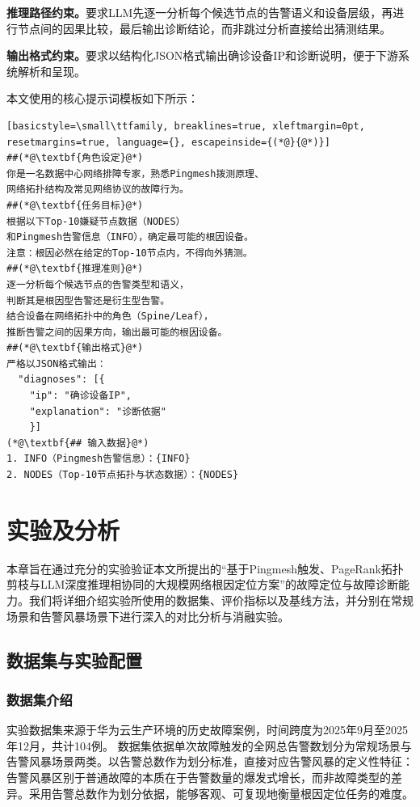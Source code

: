 \textbf{推理路径约束。}要求LLM先逐一分析每个候选节点的告警语义和设备层级，再进行节点间的因果比较，最后输出诊断结论，而非跳过分析直接给出猜测结果。

\textbf{输出格式约束。}要求以结构化JSON格式输出确诊设备IP和诊断说明，便于下游系统解析和呈现。

本文使用的核心提示词模板如下所示：


\begin{tcolorbox}[breakable,
    colback=gray!3, colframe=gray!60,
    title={\textbf{语义推理模块 提示词模板}},
    fonttitle=\bfseries, fontupper=\small,
    arc=1mm, left=6pt, right=6pt, top=6pt, bottom=6pt]
\begin{lstlisting}[basicstyle=\small\ttfamily, breaklines=true, xleftmargin=0pt, resetmargins=true, language={}, escapeinside={(*@}{@*)}]
##(*@\textbf{角色设定}@*)
你是一名数据中心网络排障专家，熟悉Pingmesh拨测原理、
网络拓扑结构及常见网络协议的故障行为。
##(*@\textbf{任务目标}@*)
根据以下Top-10嫌疑节点数据（NODES）
和Pingmesh告警信息（INFO），确定最可能的根因设备。
注意：根因必然在给定的Top-10节点内，不得向外猜测。
##(*@\textbf{推理准则}@*)
逐一分析每个候选节点的告警类型和语义，
判断其是根因型告警还是衍生型告警。
结合设备在网络拓扑中的角色（Spine/Leaf），
推断告警之间的因果方向，输出最可能的根因设备。
##(*@\textbf{输出格式}@*)
严格以JSON格式输出：
  "diagnoses": [{
    "ip": "确诊设备IP",
    "explanation": "诊断依据"
    }]
(*@\textbf{## 输入数据}@*)
1. INFO（Pingmesh告警信息）：{INFO}
2. NODES（Top-10节点拓扑与状态数据）：{NODES}
\end{lstlisting}
\end{tcolorbox}

\chapter{实验及分析}
本章旨在通过充分的实验验证本文所提出的“基于Pingmesh触发、PageRank拓扑剪枝与LLM深度推理相协同的大规模网络根因定位方案”的故障定位与故障诊断能力。我们将详细介绍实验所使用的数据集、评价指标以及基线方法，并分别在常规场景和告警风暴场景下进行深入的对比分析与消融实验。
\section{数据集与实验配置}
\subsection{数据集介绍}

实验数据集来源于华为云生产环境的历史故障案例，时间跨度为2025年9月至2025年12月，共计104例。
数据集依据单次故障触发的全网总告警数划分为常规场景与告警风暴场景两类。以告警总数作为划分标准，直接对应告警风暴的定义性特征：告警风暴区别于普通故障的本质在于告警数量的爆发式增长，而非故障类型的差异。采用告警总数作为划分依据，能够客观、可复现地衡量根因定位任务的难度。

